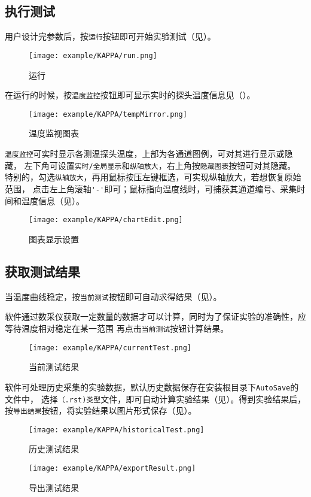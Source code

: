 \subsection{执行测试}
用户设计完参数后，按\lstinline{运行}按钮即可开始实验测试（见）。
\begin{figure}[htbp]
	\centering
	\texttt{[image: example/KAPPA/run.png]}
	\caption{ 运行 \label{fig:exmp_kappa_run}}
\end{figure}
在运行的时候，按\lstinline{温度监控}按钮即可显示实时的探头温度信息见（）。
\begin{figure}[htbp]
	\centering
	\texttt{[image: example/KAPPA/tempMirror.png]}
	\caption{ 温度监视图表 \label{fig:exmp_kappa_tempMirror}}
\end{figure}
\lstinline{温度监控}可实时显示各测温探头温度，上部为各通道图例，可对其进行显示或隐藏，
左下角可设置\lstinline{实时/全局显示}和\lstinline{纵轴放大}，右上角按\lstinline{隐藏图表}按钮可对其隐藏。
特别的，勾选\lstinline{纵轴放大}，再用鼠标按压左键框选，可实现纵轴放大，若想恢复原始范围，
点击左上角滚轴\lstinline{'-'}即可；鼠标指向温度线时，可捕获其通道编号、采集时间和温度信息（见）。\\
\begin{figure}[htbp]
	\centering
	\texttt{[image: example/KAPPA/chartEdit.png]}
	\caption{ 图表显示设置 \label{fig:exmp_kappa_chartEdit}}
\end{figure}

\subsection{获取测试结果}
	当温度曲线稳定，按\lstinline{当前测试}按钮即可自动求得结果（见）。
\begin{note}
	软件通过数采仪获取一定数量的数据才可以计算，同时为了保证实验的准确性，应等待温度相对稳定在某一范围
再点击\lstinline{当前测试}按钮计算结果。
\end{note}
\begin{figure}[htbp]
	\centering
	\texttt{[image: example/KAPPA/currentTest.png]}
	\caption{ 当前测试结果 \label{fig:exmp_kappa_currentTest}}
\end{figure}
软件可处理历史采集的实验数据，默认历史数据保存在安装根目录下\lstinline{AutoSave}的文件中，
选择\lstinline{（.rst)类型}文件，即可自动计算实验结果（见）。得到实验结果后，
按\lstinline{导出结果}按钮，将实验结果以图片形式保存（见）。
\begin{figure}[htbp]
	\centering
	\texttt{[image: example/KAPPA/historicalTest.png]}
	\caption{ 历史测试结果 \label{fig:exmp_kappa_historicalTest}}
\end{figure}

\begin{figure}[htbp]
	\centering
	\texttt{[image: example/KAPPA/exportResult.png]}
	\caption{ 导出测试结果 \label{fig:exmp_kappa_exportResult}}
\end{figure}